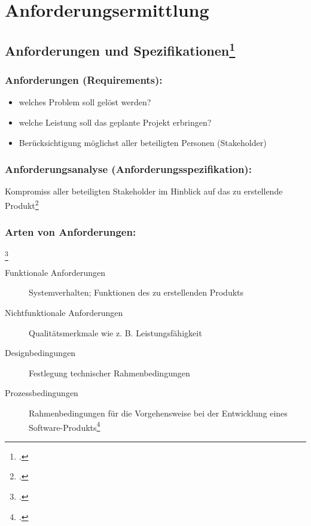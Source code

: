 \documentclass{lehramt-informatik}
\begin{document}

\chapter{Anforderungsermittlung}

%

\section{Anforderungen und Spezifikationen\footcite[Seite 13]{sosy:fs:1}}

\subsection{Anforderungen (Requirements):}

\begin{itemize}
\item welches Problem soll gelöst werden?
\item welche Leistung soll das geplante Projekt erbringen?
\item Berücksichtigung möglichst aller beteiligten Personen (Stakeholder)
\end{itemize}

\subsection{Anforderungsanalyse (Anforderungsspezifikation):}

Kompromiss aller beteiligten Stakeholder im Hinblick auf das zu
erstellende Produkt\footcite[Seite 17-20]{schatten}

\subsection{Arten von Anforderungen:}\footcite[Seite 14]{sosy:fs:1}

\begin{description}
\item[Funktionale Anforderungen]
Systemverhalten; Funktionen des zu erstellenden Produkts

\item[Nichtfunktionale Anforderungen]
Qualitätsmerkmale wie z. B. Leistungsfähigkeit

\item[Designbedingungen]
Festlegung technischer Rahmenbedingungen

\item[Prozessbedingungen]
Rahmenbedingungen für die Vorgehensweise bei der Entwicklung eines
Software-Produkts\footcite[Seite 20-22]{text}
\end{description}
\end{document}
